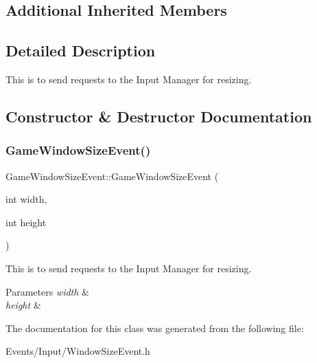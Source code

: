 \subsection*{Additional Inherited Members}


\subsection{Detailed Description}
This is to send requests to the Input Manager for resizing. 

\subsection{Constructor \& Destructor Documentation}
\mbox{\label{classGameWindowSizeEvent_a4f0c1af7b0f5aeec006d10a1232f962d}} 
\subsubsection{\texorpdfstring{Game\+Window\+Size\+Event()}{GameWindowSizeEvent()}}
{\footnotesize\ttfamily Game\+Window\+Size\+Event\+::\+Game\+Window\+Size\+Event (\begin{DoxyParamCaption}\item[{int}]{width,  }\item[{int}]{height }\end{DoxyParamCaption})\hspace{0.3cm}{\ttfamily [inline]}}



This is to send requests to the Input Manager for resizing. 


\begin{DoxyParams}{Parameters}
{\em width} & \\
\hline
{\em height} & \\
\hline
\end{DoxyParams}


The documentation for this class was generated from the following file\+:\begin{DoxyCompactItemize}
\item 
Events/\+Input/Window\+Size\+Event.\+h\end{DoxyCompactItemize}
